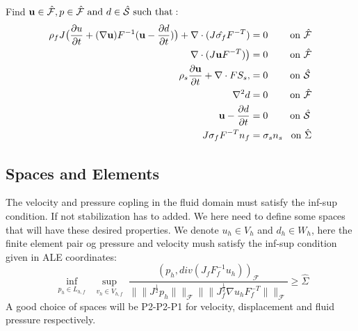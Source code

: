 Find $\bold{u} \in \hat{\mathcal{F}} , p \in \hat{\mathcal{F}} \text{  and  } d \in \hat{\mathcal{S}} \text{  such that}:$ 
\begin{align}
\rho_f J \big( \frac{\partial u}{\partial t} + (\nabla \bold{u} )F^{-1}(\bold{u} -\frac{\partial d}{\partial t})\big)  + \nabla \cdot( J \hat{\sigma_f} F^{-T})  &= 0 \hspace{8mm}\text{on  } \hat{\mathcal{F}} \\
\nabla \cdot (J \bold{u}  F^{-T})\big) &= 0 \hspace{8mm} \text{on  } \hat{\mathcal{F}}   \\
\rho_s \frac{\partial \bold{u} }{\partial t} + \nabla \cdot F S_s,&=0 \hspace{8mm} \text{on  } \hat{\mathcal{S}}\\
\nabla^2 d &= 0 \hspace{8mm} \text{on  } \hat{\mathcal{F}}\\
\bold{u} - \frac{\partial d}{\partial t}  &= 0 \hspace{8mm} \text{on  } \hat{\mathcal{S}}\\
J\sigma_f F^{-T} n_f &= \sigma_s  n_s \hspace{3mm} \text{on  } \hat{\Sigma}
\end{align}



\subsection{Spaces and Elements}
The velocity and pressure copling in the fluid domain must satisfy the inf-sup condition. If not stabilization has to added. We here need to define some spaces that will have these desired properties.
We denote $u_h \in V_h$ and $ d_h \in W_h $, here the finite element pair og pressure and velocity mush satisfy the inf-sup condition given in ALE coordinates:
$$   \inf_{\substack{p_h \in L_{h,f}}}  \sup_{\substack{v_h \in V_{h,f}}} \frac{ (p_h, div(J_f F_f^{-1} u_h))_{\mathcal{F}} }{ \|\|J^{\frac{1}{2}} p_h  \|\|_{\mathcal{F}} \|\|  J^{\frac{1}{2}}_{f} \nabla u_h F_f^{-T} \|\|_{\mathcal{F}}  } \geq \hat{\Sigma}     $$
A good choice of spaces will be P2-P2-P1 for velocity, displacement and fluid pressure respectively. 








